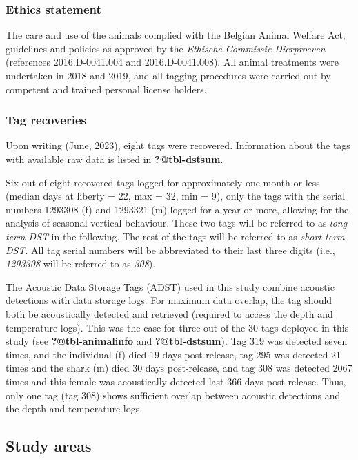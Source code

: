 \documentclass[
  authoryear,
  review,
  3p]{elsarticle}
\begin{document}
\hypertarget{ethics-statement}{%
\subsubsection{Ethics statement}\label{ethics-statement}}

The care and use of the animals complied with the Belgian Animal Welfare
Act, guidelines and policies as approved by the \emph{Ethische Commissie
Dierproeven} (references 2016.D-0041.004 and 2016.D-0041.008). All
animal treatments were undertaken in 2018 and 2019, and all tagging
procedures were carried out by competent and trained personal license
holders.

\hypertarget{tag-recoveries}{%
\subsubsection{Tag recoveries}\label{tag-recoveries}}

Upon writing (June, 2023), eight tags were recovered. Information about
the tags with available raw data is listed in \textbf{?@tbl-dstsum}.

Six out of eight recovered tags logged for approximately one month or
less (median days at liberty = 22, max = 32, min = 9), only the tags
with the serial numbers 1293308 (f) and 1293321 (m) logged for a year or
more, allowing for the analysis of seasonal vertical behaviour. These
two tags will be referred to as \emph{long-term DST} in the following.
The rest of the tags will be referred to as \emph{short-term DST}. All
tag serial numbers will be abbreviated to their last three digits (i.e.,
\emph{1293308} will be referred to as \emph{308}).

The Acoustic Data Storage Tags (ADST) used in this study combine
acoustic detections with data storage logs. For maximum data overlap,
the tag should both be acoustically detected and retrieved (required to
access the depth and temperature logs). This was the case for three out
of the 30 tags deployed in this study (see \textbf{?@tbl-animalinfo} and
\textbf{?@tbl-dstsum}). Tag 319 was detected seven times, and the
individual (f) died 19 days post-release, tag 295 was detected 21 times
and the shark (m) died 30 days post-release, and tag 308 was detected
2067 times and this female was acoustically detected last 366 days
post-release. Thus, only one tag (tag 308) shows sufficient overlap
between acoustic detections and the depth and temperature logs.

\hypertarget{sec-mm_studyarea}{%
\subsection{Study areas}\label{sec-mm_studyarea}}
\end{document}
